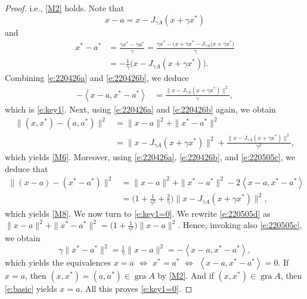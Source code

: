 \documentclass[12pt]{article}
\newcommand{\scal}[2]{\left\langle{#1},{#2}  \right\rangle}
\theoremstyle{definition}
\providecommand{\gr}{\operatorname{gra}}
\providecommand{\gr}{\operatorname{gra}}
\begin{document}
{\begin{proof}
i.e., \cref{M2} holds. 
Note that 
\begin{equation}
\label{e:220426a}
x-a = x-J_{\gamma A}(x+\gamma x^*)
\end{equation}
and 
\begin{subequations}
\label{e:220426b}
\begin{align}
x^*-a^* 
&= \frac{\gamma x^*-\gamma a^*}{\gamma}
= \frac{\gamma x^* - \big(x+\gamma x^*-J_{\gamma A}(x+\gamma x^*\big)}{\gamma}\\
&= -\frac{1}{\gamma}\big(x - J_{\gamma A}(x+\gamma x^*)\big). 
\end{align}
\end{subequations}
Combining \cref{e:220426a} and \cref{e:220426b}, we deduce 
\begin{align}
\label{e:220505c}
-\scal{x-a}{x^*-a^*} 
&= 
\frac{\|x-J_{\gamma A}(x+\gamma x^*)\|^2}{\gamma},
\end{align}
which is \cref{e:key1}. 
Next, using \cref{e:220426a} and \cref{e:220426b} again, we obtain 
\begin{subequations}
\label{e:220505d}
\begin{align}
\|(x,x^*)-(a,a^*)\|^2
&= 
\|x-a\|^2 + \|x^*-a^*\|^2\\
&= 
\|x-J_{\gamma A}(x+\gamma x^*)\|^2 
+ \frac{\|x-J_{\gamma A}(x+\gamma x^*)\|^2}{\gamma^2}, 
\end{align}
\end{subequations}
which yields \cref{M6}. 
Moreover, using \cref{e:220426a}, \cref{e:220426b}, and 
\cref{e:220505c}, we deduce that 
\begin{subequations}
\begin{align}
\big\|(x-a)-(x^*-a^*)\big\|^2
&= \|x-a\|^2 + \|x^*-a^*\|^2 - 2\scal{x-a}{x^*-a^*}\\
&= \big(1+\tfrac{1}{\gamma^2}+\tfrac{2}{\gamma} \big)\|x-J_{\gamma A}(x+\gamma x^*)\|^2, 
\end{align}
\end{subequations}
which yields \cref{M8}.
We now turn to \cref{e:key1=0}. 
We rewrite \cref{e:220505d} as 
$\|x-a\|^2+\|x^*-a^*\|^2 
= \big(1+\tfrac{1}{\gamma^2}\big)\|x-a\|^2$.
Hence, invoking also \cref{e:220505c}, we obtain
\begin{equation}
\gamma\|x^*-a^*\|^2 = 
\tfrac{1}{\gamma}\|x-a\|^2 = -\scal{x-a}{x^*-a^*},
\end{equation}
which yields the equivalences 
$x=a$
$\Leftrightarrow$
$x^*=a^*$
$\Leftrightarrow$
$\scal{x-a}{x^*-a^*}=0$.
If $x=a$, then $(x,x^*)=(a,a^*)\in \gr A$ by \cref{M2}.
And if $(x,x^*)\in\gr A$, 
then \cref{e:basic} yields $x=a$.
All this proves \cref{e:key1=0}.
\end{proof}

}
\end{document}
